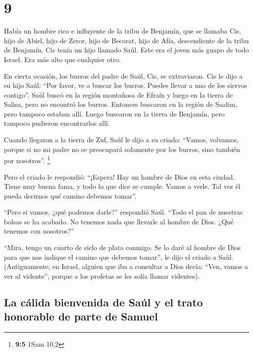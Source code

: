\hypertarget{section-8}{%
\section{9}\label{section-8}}

 Había un hombre rico e influyente de la tribu de
Benjamín, que se llamaba Cis, hijo de Abiel, hijo de Zeror, hijo de
Becorat, hijo de Afía, descendiente de la tribu de Benjamín.
 Cis tenía un hijo llamado Saúl. Este era el joven más
guapo de todo Israel. Era más alto que cualquier otro.

 En cierta ocasión, los burros del padre de Saúl, Cis, se
extraviaron. Cis le dijo a su hijo Saúl: ``Por favor, ve a buscar los
burros. Puedes llevar a uno de los siervos contigo''. 
Saúl buscó en la región montañosa de Efraín y luego en la tierra de
Salisa, pero no encontró los burros. Entonces buscaron en la región de
Saalim, pero tampoco estaban allí. Luego buscaron en la tierra de
Benjamín, pero tampoco pudieron encontrarlos allí.

 Cuando llegaron a la tierra de Zuf, Saúl le dijo a su
criado: ``Vamos, volvamos, porque si no mi padre no se preocupará
solamente por los burros, sino también por nosotros''. \footnote{\textbf{9:5}
  1Sam 10,2}

 Pero el criado le respondió: ``¡Espera! Hay un hombre de
Dios en esta ciudad. Tiene muy buena fama, y todo lo que dice se cumple.
Vamos a verle. Tal vez él pueda decirnos qué camino debemos tomar''.

 ``Pero si vamos, ¿qué podemos darle?'' respondió Saúl.
``Todo el pan de nuestras bolsas se ha acabado. No tenemos nada que
llevarle al hombre de Dios. ¿Qué tenemos con nosotros?''

 ``Mira, tengo un cuarto de siclo de plata conmigo. Se lo
daré al hombre de Dios para que nos indique el camino que debemos
tomar'', le dijo el criado a Saúl.  (Antiguamente, en
Israel, alguien que iba a consultar a Dios decía: ``Ven, vamos a ver al
vidente'', porque a los profetas se les solía llamar videntes).

\hypertarget{la-cuxe1lida-bienvenida-de-sauxfal-y-el-trato-honorable-de-parte-de-samuel}{%
\subsection{La cálida bienvenida de Saúl y el trato honorable de parte
de
Samuel}\label{la-cuxe1lida-bienvenida-de-sauxfal-y-el-trato-honorable-de-parte-de-samuel}}

